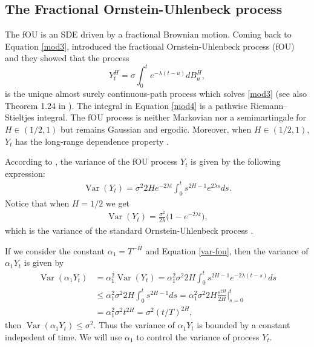 \documentclass[smallextended]{svjour3}
\DeclareMathOperator{\Var}{Var}
\begin{document}
    \subsection{The Fractional Ornstein-Uhlenbeck process}\label{sect-OU}
        The fOU is an SDE driven by a fractional Brownian motion. 
    Coming back to Equation \eqref{mod3}, \cite{ch-ka-ma}
    introduced the fractional Ornstein-Uhlenbeck process (fOU) and they 
    showed that the process
    \begin{equation}
        Y_t ^ H = 
            \sigma \int_0 ^ t e ^ {-\lambda(t - u)} dB_u^H, 
        \label{mod4}
    \end{equation}
    is the unique almost surely continuous-path process which solves 
    \eqref{mod3} (see also Theorem 1.24 in \cite{ra}).
    The integral in Equation \eqref{mod4} is a
    pathwise Riemann–Stieltjes integral.  The fOU process is neither Markovian 
    nor a semimartingale for $H \in(1/2,1)$  \citep[see][]{du-no} but remains
    Gaussian and ergodic. Moreover, when $H \in(1/2,1)$, $Y_t$ has the 
    long-range dependence property \cite{ch-ka-ma,ra}.

    According to \cite{ze-ch-ya}, the variance of the fOU process $Y_t$ is 
    given by the following expression:
    \begin{align}
        \Var(Y_t)= 
            \sigma^2 2H e^{-2\lambda t} 
            \int_0^t s^{2H-1} e^{2\lambda s} ds.\label{var-fou}
    \end{align}
    Notice that when $H=1/2$ we get
    \begin{align}
        \Var(Y_t)= \frac{\sigma^2}{2\lambda}  \big(1-e^{-2\lambda t}\big),
    \end{align}
    which is the variance of the standard Ornstein-Uhlenbeck process 
   \citep[see][p. 143]{mik}. 

    If we consider the constant $\alpha_1 = T^{-H}$ and  Equation
    \eqref{var-fou}, then the variance of $\alpha_1 Y_t$ is 
    given by
    \begin{equation} \label{var-fou1}
        \begin{aligned}
            \Var(\alpha_1 Y_t)
                & = 
                    \alpha_1 ^2 
                    \Var(Y_t)= \alpha_1^2 \sigma ^ 2 2H  
                    \int_0^t
                        s^{2H - 1} 
                        e^{-2 \lambda (t - s)} 
                    ds
                \\
                & \le 
                    \alpha_1 ^ 2 
                    \sigma^2 2H  
                    \int_0^t
                         s^{2H-1} ds
                     = \alpha_1^2 \sigma^2 2H
                    \frac{s^{2H}}{2H}
                    \Big|_{s=0}^t 
                \\
                & = 
                    \alpha_1 ^ 2 
                    \sigma ^ 2 t ^ {2H} 
                    = \sigma ^ 2 (t / T) ^ {2H},
        \end{aligned}
    \end{equation}
    then $\Var(\alpha_1 Y_t)\le \sigma^2 $. Thus the variance of $\alpha_1 Y_t$ 
    is bounded by a constant indepedent of time. We will use $\alpha_1$ to 
    control the variance of process $Y_t$.
%
\end{document}
